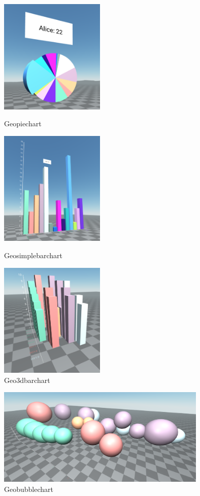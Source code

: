 \documentclass[a4paper, 12pt]{book}
\begin{document}
\begin{figure}[H]
  \centering
  \includegraphics[width=5cm, keepaspectratio]{img/development/babiaxr-pie.png}
  \caption{Geopiechart}
  \label{fig:babiaxrgeopiechart}
  \endminipage\hfill
  \includegraphics[width=5cm, keepaspectratio]{img/development/babiaxr-simplebar.png}
  \caption{Geosimplebarchart}
  \label{fig:babiaxrgeosimplebarchart}
  \endminipage\hfill
  \includegraphics[width=5cm, keepaspectratio]{img/development/babiaxr-3dbar.png}
  \caption{Geo3dbarchart}
  \label{fig:babiaxrgeo3dbarchart}
  \endminipage\hfill
\end{figure}

\begin{figure}[H]
  \centering
  \includegraphics[width=10cm, keepaspectratio]{img/development/babiaxr-bubble.png}
  \caption{Geobubblechart}
  \label{fig:babiaxrgeobubblechart}
\end{figure}
\end{document}
